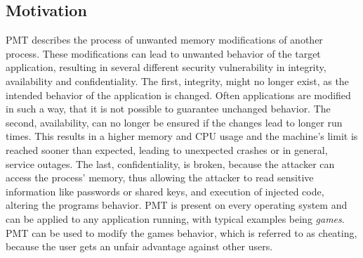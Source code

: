 \subsection{Motivation}
\gls{PMT} describes the process of unwanted memory modifications of another process. These modifications can lead to unwanted behavior of the target application, resulting in several different security vulnerability in integrity, availability and confidentiality. The first, integrity, might no longer exist, as the intended behavior of the application is changed. Often applications are modified in such a way, that it is not possible to guarantee unchanged behavior. The second, availability, can no longer be ensured if the changes lead to longer run times. This results in a higher memory and CPU usage and the machine's limit is reached sooner than expected, leading to unexpected crashes or in general, service outages. The last, confidentiality, is broken, because the attacker can access the process' memory, thus allowing the attacker to read sensitive information like passwords or shared keys, and execution of injected code, altering the programs behavior. \gls{PMT} is present on every operating system and can be applied to any application running, with typical examples being \emph{games}. \gls{PMT} can be used to modify the games behavior, which is referred to as cheating, because the user gets an unfair advantage against other users.